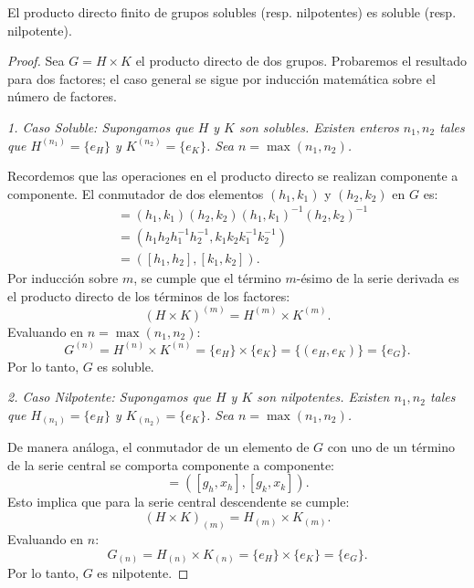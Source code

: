 \begin{prop}
    El producto directo finito de grupos solubles (resp. nilpotentes) es soluble (resp. nilpotente).
\end{prop}

\begin{proof}
    Sea $G = H \times K$ el producto directo de dos grupos. Probaremos el resultado para dos factores; el caso general se sigue por inducción matemática sobre el número de factores.
    
    \itshape 1. Caso Soluble: \normalfont
    Supongamos que $H$ y $K$ son solubles. Existen enteros $n_1, n_2$ tales que $H^{(n_1)} = \{e_H\}$ y $K^{(n_2)} = \{e_K\}$. Sea $n = \max(n_1, n_2)$.
    
    Recordemos que las operaciones en el producto directo se realizan componente a componente. El conmutador de dos elementos $(h_1, k_1)$ y $(h_2, k_2)$ en $G$ es:
    \begin{align*}
        [(h_1, k_1), (h_2, k_2)] &= (h_1, k_1)(h_2, k_2)(h_1, k_1)^{-1}(h_2, k_2)^{-1} \\
        &= (h_1 h_2 h_1^{-1} h_2^{-1}, k_1 k_2 k_1^{-1} k_2^{-1}) \\
        &= ([h_1, h_2], [k_1, k_2]).
    \end{align*}
    Por inducción sobre $m$, se cumple que el término $m$-ésimo de la serie derivada es el producto directo de los términos de los factores:
    \begin{equation*}
        (H \times K)^{(m)} = H^{(m)} \times K^{(m)}.
    \end{equation*}
    Evaluando en $n = \max(n_1, n_2)$:
    \begin{equation*}
        G^{(n)} = H^{(n)} \times K^{(n)} = \{e_H\} \times \{e_K\} = \{(e_H, e_K)\} = \{e_G\}.
    \end{equation*}
    Por lo tanto, $G$ es soluble.

    \itshape 2. Caso Nilpotente: \normalfont
    Supongamos que $H$ y $K$ son nilpotentes. Existen $n_1, n_2$ tales que $H_{(n_1)} = \{e_H\}$ y $K_{(n_2)} = \{e_K\}$. Sea $n = \max(n_1, n_2)$.
    
    De manera análoga, el conmutador de un elemento de $G$ con uno de un término de la serie central se comporta componente a componente:
    \begin{equation*}
        [ (g_h, g_k), (x_h, x_k) ] = ([g_h, x_h], [g_k, x_k]).
    \end{equation*}
    Esto implica que para la serie central descendente se cumple:
    \begin{equation*}
        (H \times K)_{(m)} = H_{(m)} \times K_{(m)}.
    \end{equation*}
    Evaluando en $n$:
    \begin{equation*}
        G_{(n)} = H_{(n)} \times K_{(n)} = \{e_H\} \times \{e_K\} = \{e_G\}.
    \end{equation*}
    Por lo tanto, $G$ es nilpotente.
\end{proof}

